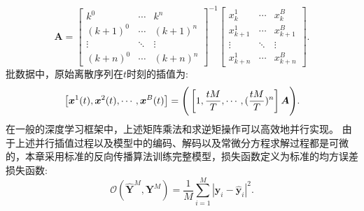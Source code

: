 \begin{equation}
\boldsymbol{A}=\left[\begin{array}{ccc}
k^{0} & \cdots & k^{n} \\
(k+1)^0 & \cdots & (k+1)^{n} \\
\vdots & \ddots & \vdots \\
(k+n)^0 & \cdots & (k+n)^{n}
\end{array}\right]^{-1}\left[\begin{array}{ccc}
x_{k}^{1} & \cdots & x_{k}^{B} \\
x_{k+1}^{1} & \cdots & x_{k+1}^{B} \\
\vdots & \ddots & \vdots \\
x_{k+n}^{1} & \cdots & x_{k+n}^{B}
\end{array}\right].
\end{equation}
批数据中，原始离散序列在$t$时刻的插值为:
\begin{equation}
\left[ \boldsymbol x^1(t), \boldsymbol x^2(t),\cdots, \boldsymbol x^B(t)\right]= \Bigg(\left[ 1, \frac{tM}{T},\cdots, (\frac{tM}{T})^n\right]\boldsymbol{A}\Bigg). 
\end{equation}
在一般的深度学习框架中，上述矩阵乘法和求逆矩操作可以高效地并行实现。
由于上述并行插值过程以及模型中的编码、解码以及常微分方程求解过程都是可微的，本章采用标准的反向传播算法训练完整模型，损失函数定义为标准的均方误差损失函数:
\begin{equation}
\label{equ:mse_loss}
\mathcal{O}\left(\hat{\boldsymbol Y}^M, \boldsymbol{Y}^M\right)=\frac{1}{M} \sum_{i=1}^{M}\left|\boldsymbol y_{i}-\hat{\boldsymbol y}_{i}\right|^2.
\end{equation}

